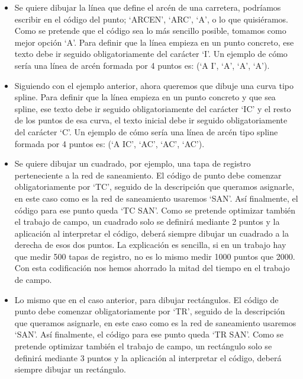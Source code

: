 \begin{itemize}

\item Se quiere dibujar la línea que define el arcén de una carretera, podríamos escribir en el código del punto; ‘ARCEN’, ‘ARC’, ‘A’, o lo que quisiéramos. Como se pretende que el código sea lo más sencillo posible, tomamos como mejor opción ‘A’. Para definir que la línea empieza en un punto concreto, ese texto debe ir seguido obligatoriamente del carácter ‘I’. Un ejemplo de cómo sería una línea de arcén formada por 4 puntos es: (‘A I’, ‘A’, ‘A’, ‘A’).


\item Siguiendo con el ejemplo anterior, ahora queremos que dibuje una curva tipo spline. Para definir que la línea empieza en un punto concreto y que sea spline, ese texto debe ir seguido obligatoriamente del carácter ‘IC’ y el resto de los puntos de esa curva, el texto inicial debe ir seguido obligatoriamente del carácter ‘C’. Un ejemplo de cómo sería una línea de arcén tipo spline formada por 4 puntos es: (‘A IC’, ‘AC’, ‘AC’, ‘AC’).

\item Se quiere dibujar un cuadrado, por ejemplo, una tapa de registro perteneciente a la red de saneamiento. El código de punto debe comenzar obligatoriamente por ‘TC’, seguido de la descripción que queramos asignarle, en este caso como es la red de saneamiento usaremos ‘SAN’. Así finalmente, el código para ese punto queda ‘TC SAN’. Como se pretende optimizar también el trabajo de campo, un cuadrado solo se definirá mediante 2 puntos y la aplicación al interpretar el código, deberá siempre dibujar un cuadrado a la derecha de esos dos puntos. La explicación es sencilla, si en un trabajo hay que medir 500 tapas de registro, no es lo mismo medir 1000 puntos que 2000. Con esta codificación nos hemos ahorrado la mitad del tiempo en el trabajo de campo.

\item Lo mismo que en el caso anterior, para dibujar rectángulos. El código de punto debe comenzar obligatoriamente por ‘TR’, seguido de la descripción que queramos asignarle, en este caso como es la red de saneamiento usaremos ‘SAN’. Así finalmente, el código para ese punto queda ‘TR SAN’. Como se pretende optimizar también el trabajo de campo, un rectángulo solo se definirá mediante 3 puntos y la aplicación al interpretar el código, deberá siempre dibujar un rectángulo.


\end{itemize}
